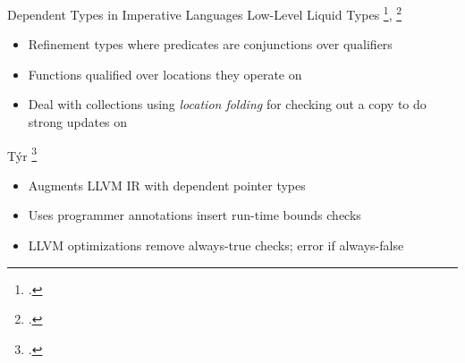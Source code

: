 \documentclass[aspectratio=169]{beamer}
\begin{document}
\begin{frame}{Dependent Types in Imperative Languages}
Low-Level Liquid Types \footcite{rondon_liquid_2008}, \footcite{rondon_low-level_2010}
\begin{itemize}
    \item Refinement types where predicates are conjunctions over qualifiers
    \item Functions qualified over locations they operate on
    \item Deal with collections using \emph{location folding} for checking out a copy to do strong updates on
\end{itemize}
T\'yr \footcite{de_araujo_tyr:_2016}
\begin{itemize}
    \item Augments LLVM IR with dependent pointer types
    \item Uses programmer annotations insert run-time bounds checks
    \item LLVM optimizations remove always-true checks; error if always-false
\end{itemize}
\vspace{0.2in}
\end{frame}
\end{document}
